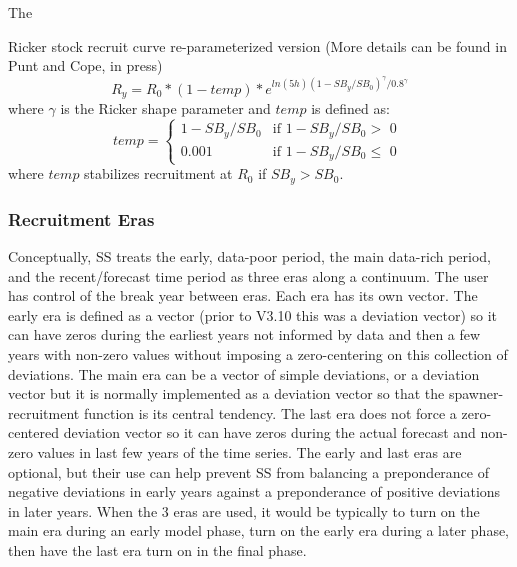 \hypertarget{Ricker2}{The} Ricker stock recruit curve re-parameterized version (More details can be found in Punt and Cope, in press)
	\begin{equation}
		R_y = R_0*(1-temp)*e^{ln(5h)(1-SB_y/SB_0)^{\gamma}/0.8^{\gamma}}
	\end{equation}
where $\gamma$ is the Ricker shape parameter and $temp$ is defined as:
	\begin{equation}
	temp = 
	\begin{cases}
		1-SB_y/SB_0 & \text{if $1-SB_y/SB_0 >$ 0 }\\
		0.001 & \text{if $1-SB_y/SB_0 \leq$ 0}
	\end{cases}		
	\end{equation}
where $temp$ stabilizes recruitment at $R_0$ if $SB_y > SB_0$. 

\subsubsection{Recruitment Eras}
Conceptually, SS treats the early, data-poor period, the main data-rich period, and the recent/forecast time period as three eras along a continuum.  The user has control of the break year between eras.  Each era has its own vector.  The early era is defined as a vector (prior to V3.10 this was a deviation vector) so it can have zeros during the earliest years not informed by data and then a few years with non-zero values without imposing a zero-centering on this collection of deviations.  The main era can be a vector of simple deviations, or a deviation vector but it is normally implemented as a deviation vector so that the spawner-recruitment function is its central tendency.  The last era does not force a zero-centered deviation vector so it can have zeros during the actual forecast and non-zero values in last few years of the time series.  The early and last eras are optional, but their use can help prevent SS from balancing a preponderance of negative deviations in early years against a preponderance of positive deviations in later years.  When the 3 eras are used, it would be typically to turn on the main era during an early model phase, turn on the early era during a later phase, then have the last era turn on in the final phase.

\hypertarget{RecBias}{}

